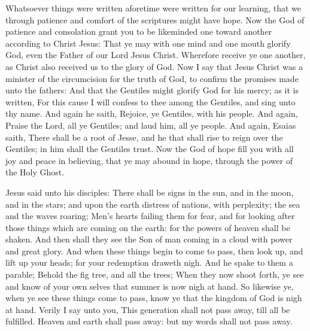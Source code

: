  Whatsoever things were written aforetime were written for our learning, that we through patience and comfort of the scriptures might have hope. Now the God of patience and consolation grant you to be likeminded one toward another according to Christ Jesus: That ye may with one mind and one mouth glorify God, even the Father of our Lord Jesus Christ. Wherefore receive ye one another, as Christ also received us to the glory of God. Now I say that Jesus Christ was a minister of the circumcision for the truth of God, to confirm the promises made unto the fathers: And that the Gentiles might glorify God for his mercy; as it is written, For this cause I will confess to thee among the Gentiles, and sing unto thy name. And again he saith, Rejoice, ye Gentiles, with his people. And again, Praise the Lord, all ye Gentiles; and laud him, all ye people. And again, Esaias saith, There shall be a root of Jesse, and he that shall rise to reign over the Gentiles; in him shall the Gentiles trust. Now the God of hope fill you with all joy and peace in believing, that ye may abound in hope, through the power of the Holy Ghost.


 Jesus said unto his disciples: There shall be signs in the sun, and in the moon, and in the stars; and upon the earth distress of nations, with perplexity; the sea and the waves roaring; Men's hearts failing them for fear, and for looking after those things which are coming on the earth: for the powers of heaven shall be shaken. And then shall they see the Son of man coming in a cloud with power and great glory. And when these things begin to come to pass, then look up, and lift up your heads; for your redemption draweth nigh. And he spake to them a parable; Behold the fig tree, and all the trees; When they now shoot forth, ye see and know of your own selves that summer is now nigh at hand. So likewise ye, when ye see these things come to pass, know ye that the kingdom of God is nigh at hand. Verily I say unto you, This generation shall not pass away, till all be fulfilled. Heaven and earth shall pass away: but my words shall not pass away.


